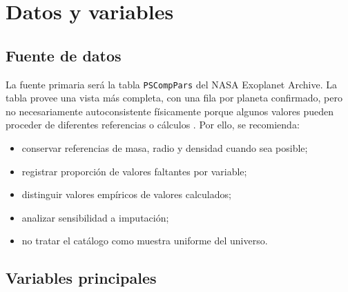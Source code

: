 \documentclass[11pt,letterpaper]{article}
\begin{document}
\section{Datos y variables}

\subsection{Fuente de datos}

La fuente primaria será la tabla \texttt{PSCompPars} del NASA Exoplanet Archive. La tabla provee una vista más completa, con una fila por planeta confirmado, pero no necesariamente autoconsistente físicamente porque algunos valores pueden proceder de diferentes referencias o cálculos \cite{nasa_pscp_about,nasa_pscp_calc}. Por ello, se recomienda:

\begin{itemize}
    \item conservar referencias de masa, radio y densidad cuando sea posible;
    \item registrar proporción de valores faltantes por variable;
    \item distinguir valores empíricos de valores calculados;
    \item analizar sensibilidad a imputación;
    \item no tratar el catálogo como muestra uniforme del universo.
\end{itemize}

\subsection{Variables principales}
\end{document}
